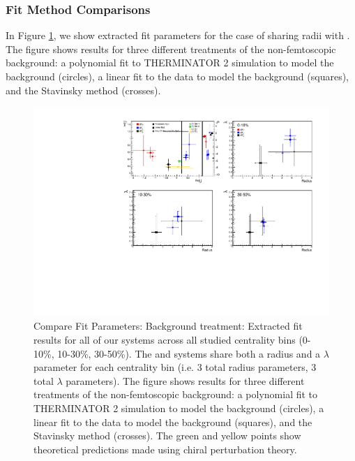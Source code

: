 \documentclass[/home/jesse/Analysis/FemtoAnalysis/AnalysisNotes/AnalysisNoteJBuxton.tex]{subfiles}
\begin{document}
\subsubsection{Fit Method Comparisons}
\label{ResultsLamK_FitMethComp}

In Figure \ref{fig:FitResults_ShareR_Sharelam_PolyBgd}, we show extracted fit parameters for the case of \LamKchPALamKchM sharing radii with \LamKchMALamKchP.  The figure shows results for three different treatments of the non-femtoscopic background: a polynomial fit to THERMINATOR 2 simulation to model the background (circles), a linear fit to the data to model the background (squares), and the Stavinsky method (crosses).


\begin{figure}[h]
  \centering
  \includegraphics[width=\textwidth]{7_ResultsAndDiscussion/Figures/CompareAllScattParams_CompBgdTreatment_StatOnly.pdf}
  \caption[Compare Fit Parameters: Background treatment]{Compare Fit Parameters: Background treatment: Extracted fit results for all of our \LamALamKpm systems across all studied centrality bins (0-10\%, 10-30\%, 30-50\%).  The \LamKchPALamKchM and \LamKchMALamKchP systems share both a radius and a $\lambda$ parameter for each centrality bin (i.e. 3 total radius parameters, 3 total $\lambda$ parameters).  The figure shows results for three different treatments of the non-femtoscopic background: a polynomial fit to THERMINATOR 2 simulation to model the background (circles), a linear fit to the data to model the background (squares), and the Stavinsky method (crosses).  The green \cite{Liu:2006xja} and yellow \cite{Mai:2009ce} points show theoretical predictions made using chiral perturbation theory.}
  \label{fig:FitResults_ShareR_Sharelam_PolyBgd}
\end{figure}
\end{document}
